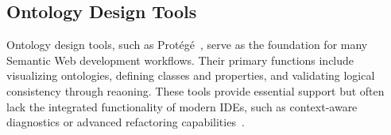 \subsection*{Ontology Design Tools}

Ontology design tools, such as Protégé~\cite{protege2015}, serve as the foundation for many Semantic Web development workflows. 
Their primary functions include visualizing ontologies, defining classes and properties, and validating logical consistency through reaoning.
These tools provide essential support but often lack the integrated functionality of modern IDEs, such as context-aware diagnostics or advanced refactoring capabilities~\cite{ComparingOntologyBuildingTools}.


